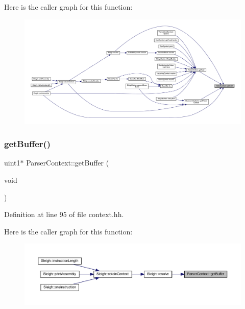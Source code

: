 Here is the caller graph for this function\+:
\nopagebreak
\begin{figure}[H]
\begin{center}
\leavevmode
\includegraphics[width=350pt]{class_parser_context_a6e19b91b26906e6678f1065d9118da05_icgraph}
\end{center}
\end{figure}
\mbox{\label{class_parser_context_a48bb82379ee3ff25a90e420a45506b20}} 
\subsubsection{\texorpdfstring{getBuffer()}{getBuffer()}}
{\footnotesize\ttfamily uint1$\ast$ Parser\+Context\+::get\+Buffer (\begin{DoxyParamCaption}\item[{void}]{ }\end{DoxyParamCaption})\hspace{0.3cm}{\ttfamily [inline]}}



Definition at line 95 of file context.\+hh.

Here is the caller graph for this function\+:
\nopagebreak
\begin{figure}[H]
\begin{center}
\leavevmode
\includegraphics[width=350pt]{class_parser_context_a48bb82379ee3ff25a90e420a45506b20_icgraph}
\end{center}
\end{figure}
\mbox{\label{class_parser_context_a9dd73c7794a457c62b25d733e8825161}} 
